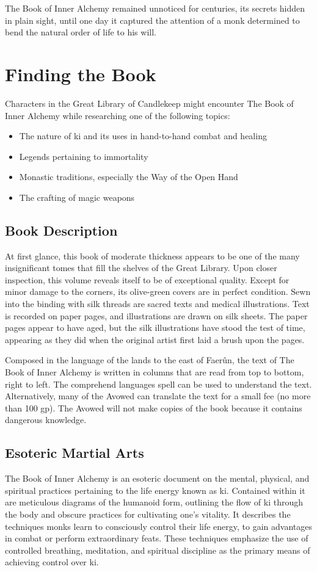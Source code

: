 \documentclass[10pt,a4paper,twoside,bg=print,twocolumn,openany,nodeprecatedcode]{dndbook}
\begin{document}
The Book of Inner Alchemy remained unnoticed for centuries, its secrets hidden in plain sight, until one day it captured the attention of a monk determined to bend the natural order of life to his will.

\section{Finding the Book}
Characters in the Great Library of Candlekeep might encounter The Book of Inner Alchemy while researching one of the following topics:


\begin{itemize}
\item The nature of ki and its uses in hand-to-hand combat and healing
\item Legends pertaining to immortality
\item Monastic traditions, especially the Way of the Open Hand
\item The crafting of magic weapons
\end{itemize}

\subsection{Book Description}
At first glance, this book of moderate thickness appears to be one of the many insignificant tomes that fill the shelves of the Great Library. Upon closer inspection, this volume reveals itself to be of exceptional quality. Except for minor damage to the corners, its olive-green covers are in perfect condition. Sewn into the binding with silk threads are sacred texts and medical illustrations. Text is recorded on paper pages, and illustrations are drawn on silk sheets. The paper pages appear to have aged, but the silk illustrations have stood the test of time, appearing as they did when the original artist first laid a brush upon the pages.

Composed in the language of the lands to the east of Faerûn, the text of The Book of Inner Alchemy is written in columns that are read from top to bottom, right to left. The comprehend languages spell can be used to understand the text. Alternatively, many of the Avowed can translate the text for a small fee (no more than 100 gp). The Avowed will not make copies of the book because it contains dangerous knowledge.

\subsection{Esoteric Martial Arts}
The Book of Inner Alchemy is an esoteric document on the mental, physical, and spiritual practices pertaining to the life energy known as ki. Contained within it are meticulous diagrams of the humanoid form, outlining the flow of ki through the body and obscure practices for cultivating one's vitality. It describes the techniques monks learn to consciously control their life energy, to gain advantages in combat or perform extraordinary feats. These techniques emphasize the use of controlled breathing, meditation, and spiritual discipline as the primary means of achieving control over ki.
\end{document}
